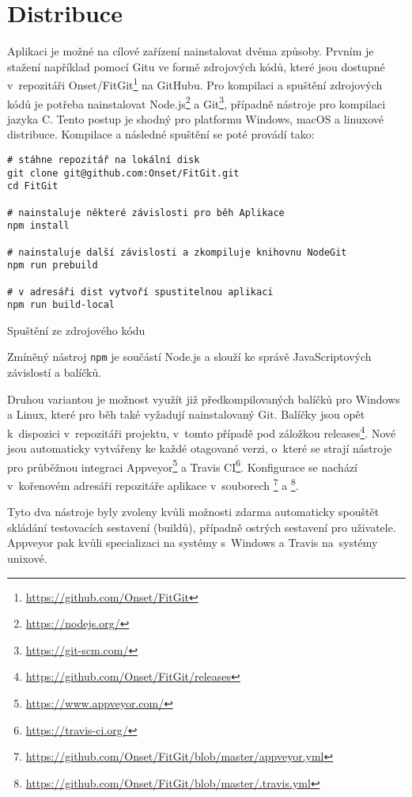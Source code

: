 \chapter{Distribuce}

Aplikaci je možné na cílové zařízení nainstalovat dvěma způsoby. Prvním je stažení například pomocí Gitu ve formě zdrojových kódů, které jsou dostupné v~repozitáři Onset/FitGit\footnote{\url{https://github.com/Onset/FitGit}} na GitHubu. Pro kompilaci a spuštění zdrojových kódů je potřeba nainstalovat Node.js\footnote{\url{https://nodejs.org/}} a Git\footnote{\url{https://git-scm.com/}}, případně nástroje pro kompilaci jazyka C. Tento postup je shodný pro platformu Windows, macOS a linuxové distribuce. Kompilace a následné spuštění se poté provádí tako:

\FloatBarrier
\begin{listing}[ht]
	\begin{verbatim}
# stáhne repozitář na lokální disk
git clone git@github.com:Onset/FitGit.git
cd FitGit

# nainstaluje některé závislosti pro běh Aplikace
npm install

# nainstaluje další závislosti a zkompiluje knihovnu NodeGit
npm run prebuild

# v adresáři dist vytvoří spustitelnou aplikaci
npm run build-local
	\end{verbatim}
	\caption{Spuštění ze zdrojového kódu}
\end{listing}
\FloatBarrier

Zmíněný nástroj \texttt{npm} je součástí Node.js a slouží ke správě JavaScriptových závislostí a balíčků.

Druhou variantou je možnost využít již předkompilovaných balíčků pro Windows a Linux, které pro běh také vyžadují nainstalovaný Git. Balíčky jsou opět k~dispozici v~repozitáři projektu, v~tomto případě pod záložkou releases\footnote{\url{https://github.com/Onset/FitGit/releases}}. Nové jsou automaticky vytvářeny ke každé otagované verzi, o~které se strají nástroje pro průběžnou integraci Appveyor\footnote{\url{https://www.appveyor.com/}} a Travis CI\footnote{\url{https://travis-ci.org/}}. Konfigurace se nachází v~kořenovém adresáři repozitáře aplikace v~souborech \footnote{\url{https://github.com/Onset/FitGit/blob/master/appveyor.yml}} a \footnote{\url{https://github.com/Onset/FitGit/blob/master/.travis.yml}}.

Tyto dva nástroje byly zvoleny kvůli možnosti zdarma automaticky spouštět skládání testovacích sestavení (buildů), případně ostrých sestavení pro uživatele. Appveyor pak kvůli specializaci na systémy s~Windows a Travis na~systémy unixové.

